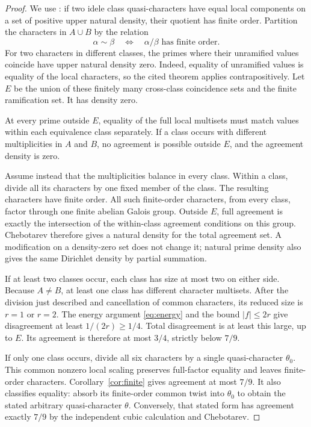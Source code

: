 \documentclass[11pt]{article}
\theoremstyle{remark}\newtheorem{remark}[theorem]{Remark}
\begin{document}
\begin{proof}
We use \cite[Theorem~1, p.~692]{Rajan}: if two idele class quasi-characters have equal local components on a set of positive upper natural density, their quotient has finite order. Partition the characters in $A\cup B$ by the relation
\[
 \alpha\sim\beta\quad\Longleftrightarrow\quad\alpha/\beta\text{ has finite order}.
\]
For two characters in different classes, the primes where their unramified values coincide have upper natural density zero. Indeed, equality of unramified values is equality of the local characters, so the cited theorem applies contrapositively. Let $E$ be the union of these finitely many cross-class coincidence sets and the finite ramification set. It has density zero.

At every prime outside $E$, equality of the full local multisets must match values within each equivalence class separately. If a class occurs with different multiplicities in $A$ and $B$, no agreement is possible outside $E$, and the agreement density is zero.

Assume instead that the multiplicities balance in every class. Within a class, divide all its characters by one fixed member of the class. The resulting characters have finite order. All such finite-order characters, from every class, factor through one finite abelian Galois group. Outside $E$, full agreement is exactly the intersection of the within-class agreement conditions on this group. Chebotarev therefore gives a natural density for the total agreement set. A modification on a density-zero set does not change it; natural prime density also gives the same Dirichlet density by partial summation.

If at least two classes occur, each class has size at most two on either side. Because $A\ne B$, at least one class has different character multisets. After the division just described and cancellation of common characters, its reduced size is $r=1$ or $r=2$. The energy argument \eqref{eq:energy} and the bound $|f|\le2r$ give disagreement at least $1/(2r)\ge1/4$. Total disagreement is at least this large, up to $E$. Its agreement is therefore at most $3/4$, strictly below $7/9$.

If only one class occurs, divide all six characters by a single quasi-character $\theta_0$. This common nonzero local scaling preserves full-factor equality and leaves finite-order characters. Corollary~\ref{cor:finite} gives agreement at most $7/9$. It also classifies equality: absorb its finite-order common twist into $\theta_0$ to obtain the stated arbitrary quasi-character $\theta$. Conversely, that stated form has agreement exactly $7/9$ by the independent cubic calculation and Chebotarev.
\end{proof}
\end{document}
